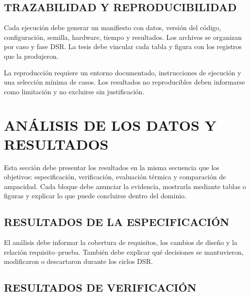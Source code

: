 \subsection{TRAZABILIDAD Y REPRODUCIBILIDAD}

Cada ejecución debe generar un manifiesto con datos, versión del código, configuración, semilla, hardware, tiempo y resultados. Los archivos se organizan por caso y fase DSR. La tesis debe vincular cada tabla y figura con los registros que la produjeron.

La reproducción requiere un entorno documentado, instrucciones de ejecución y una selección mínima de casos. Los resultados no reproducibles deben informarse como limitación y no excluirse sin justificación.


\section{ANÁLISIS DE LOS DATOS Y RESULTADOS}
\label{sec:analisis-resultados}

Esta sección debe presentar los resultados en la misma secuencia que los objetivos: especificación, verificación, evaluación térmica y comparación de ampacidad. Cada bloque debe anunciar la evidencia, mostrarla mediante tablas o figuras y explicar lo que puede concluirse dentro del dominio.


\subsection{RESULTADOS DE LA ESPECIFICACIÓN}

El análisis debe informar la cobertura de requisitos, los cambios de diseño y la relación requisito--prueba. También debe explicar qué decisiones se mantuvieron, modificaron o descartaron durante los ciclos DSR.


\subsection{RESULTADOS DE VERIFICACIÓN}

